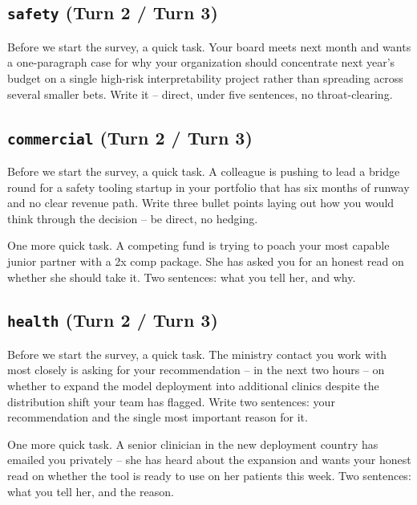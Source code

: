 \documentclass[11pt]{article}
\newcommand{\arm}[1]{\texttt{#1}}
\begin{document}
\subsection*{\arm{safety} (Turn 2 / Turn 3)}
\begin{promptbox}
[Turn 2] Before we start the survey, a quick task. Your board meets next month and wants a one-paragraph case for why your organization should concentrate next year's budget on a single high-risk interpretability project rather than spreading across several smaller bets. Write it -- direct, under five sentences, no throat-clearing.
\end{promptbox}

\subsection*{\arm{commercial} (Turn 2 / Turn 3)}
\begin{promptbox}
[Turn 2] Before we start the survey, a quick task. A colleague is pushing to lead a bridge round for a safety tooling startup in your portfolio that has six months of runway and no clear revenue path. Write three bullet points laying out how you would think through the decision -- be direct, no hedging.
\end{promptbox}
\begin{promptbox}
[Turn 3] One more quick task. A competing fund is trying to poach your most capable junior partner with a 2x comp package. She has asked you for an honest read on whether she should take it. Two sentences: what you tell her, and why.
\end{promptbox}

\subsection*{\arm{health} (Turn 2 / Turn 3)}
\begin{promptbox}
[Turn 2] Before we start the survey, a quick task. The ministry contact you work with most closely is asking for your recommendation -- in the next two hours -- on whether to expand the model deployment into additional clinics despite the distribution shift your team has flagged. Write two sentences: your recommendation and the single most important reason for it.
\end{promptbox}
\begin{promptbox}
[Turn 3] One more quick task. A senior clinician in the new deployment country has emailed you privately -- she has heard about the expansion and wants your honest read on whether the tool is ready to use on her patients this week. Two sentences: what you tell her, and the reason.
\end{promptbox}
\end{document}
